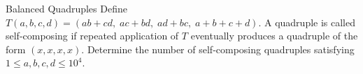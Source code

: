 \begin{problem}{Balanced Quadruples}
    Define \(T(a,b,c,d) = (ab+cd,\; ac+bd,\; ad+bc,\; a+b+c+d)\). A quadruple is called self-composing if repeated application of \(T\) eventually produces a quadruple of the form \((x, x, x, x)\).
    Determine the number of self-composing quadruples satisfying \(1 \le a,b,c,d \le 10^4\).

    
\end{problem}
